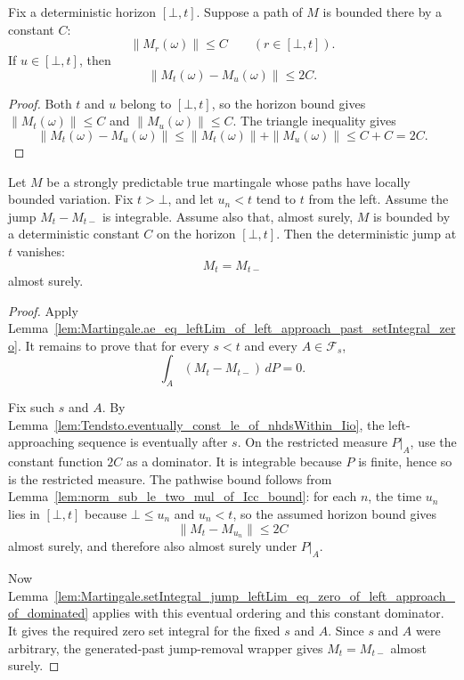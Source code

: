 \begin{lemma}\label{lem:norm_sub_le_two_mul_of_Icc_bound}
Fix a deterministic horizon \([\bot,t]\).  Suppose a path of \(M\) is bounded
there by a constant \(C\):
\[
  \|M_r(\omega)\|\le C \qquad (r\in[\bot,t]).
\]
If \(u\in[\bot,t]\), then
\[
  \|M_t(\omega)-M_u(\omega)\|\le 2C .
\]
\end{lemma}

\begin{proof}
Both \(t\) and \(u\) belong to \([\bot,t]\), so the horizon bound gives
\(\|M_t(\omega)\|\le C\) and \(\|M_u(\omega)\|\le C\).  The triangle
inequality gives
\[
  \|M_t(\omega)-M_u(\omega)\|
    \le \|M_t(\omega)\|+\|M_u(\omega)\|
    \le C+C=2C .
\]
\end{proof}

\begin{lemma}\label{lem:Martingale.ae_eq_leftLim_of_left_approach_past_setIntegral_zero_of_bound}
Let \(M\) be a strongly predictable true martingale whose paths have locally
bounded variation.  Fix \(t>\bot\), and let \(u_n<t\) tend to \(t\) from the
left.  Assume the jump \(M_t-M_{t-}\) is integrable.  Assume also that, almost
surely, \(M\) is bounded by a deterministic constant \(C\) on the horizon
\([\bot,t]\).  Then the deterministic jump at \(t\) vanishes:
\[
  M_t=M_{t-}
\]
almost surely.
\end{lemma}

\begin{proof}
Apply
Lemma~\ref{lem:Martingale.ae_eq_leftLim_of_left_approach_past_setIntegral_zero}.
It remains to prove that for every \(s<t\) and every
\(A\in\mathcal F_s\),
\[
  \int_A (M_t-M_{t-})\,dP=0 .
\]

Fix such \(s\) and \(A\).  By
Lemma~\ref{lem:Tendsto.eventually_const_le_of_nhdsWithin_Iio}, the
left-approaching sequence is eventually after \(s\).  On the restricted
measure \(P|_A\), use the constant function \(2C\) as a dominator.  It is
integrable because \(P\) is finite, hence so is the restricted measure.  The
pathwise bound follows from
Lemma~\ref{lem:norm_sub_le_two_mul_of_Icc_bound}: for each \(n\), the time
\(u_n\) lies in \([\bot,t]\) because \(\bot\le u_n\) and \(u_n<t\), so the
assumed horizon bound gives
\[
  \|M_t-M_{u_n}\|\le 2C
\]
almost surely, and therefore also almost surely under \(P|_A\).

Now
Lemma~\ref{lem:Martingale.setIntegral_jump_leftLim_eq_zero_of_left_approach_of_dominated}
applies with this eventual ordering and this constant dominator.  It gives
the required zero set integral for the fixed \(s\) and \(A\).  Since \(s\)
and \(A\) were arbitrary, the generated-past jump-removal wrapper gives
\(M_t=M_{t-}\) almost surely.
\end{proof}

